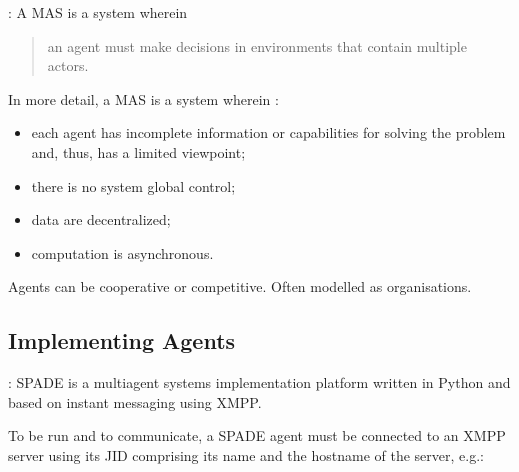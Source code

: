 \begin{frame}{\insertsection: \insertsubsection}
    \onslide<+->
    A \ac{MAS} is a system wherein \blockquote[\cite{russell2022ArtificialIntelligenceModern}]{\textelp{} an agent must make decisions in environments that contain multiple actors.}

    \onslide<+->
    \bigskip
    In more detail, a \ac{MAS} is a system wherein \cite{dignum2013MultiagentOrganizations}:
    \begin{itemize}
        \item each agent has incomplete information or capabilities for solving the problem and, thus, has a \alert{limited viewpoint}; 
        \item there is no system global \alert{control}; 
        \item data are \alert{decentralized};
        \item computation is \alert{asynchronous}.
    \end{itemize}

    \onslide<+->
    \bigskip

    Agents can be cooperative or competitive. Often modelled as organisations.
\end{frame}



\subsection{Implementing Agents}

\begin{frame}{\insertsection: \insertsubsection}
    \onslide<+->
    \Ac{SPADE} is a multiagent systems implementation platform written in Python and based on instant messaging using \ac{XMPP}.

    \onslide<+->
    \medskip
    To be run and to communicate, a \ac{SPADE} agent must be connected to an \ac{XMPP} server using its \ac{JID} comprising its name and the hostname of the server, e.g.:
    \begin{center}
        \quad
        \quad
    \end{center}
\end{frame}

